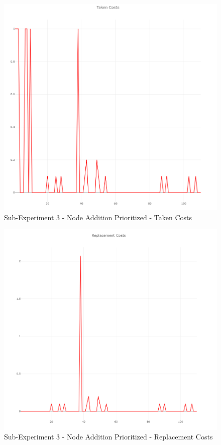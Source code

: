\begin{figure}[h]
	\centering
	\includegraphics[scale=0.5]{./pictures/addition_experiment/costs.png}
	\caption{Sub-Experiment 3 - Node Addition Prioritized - Taken Costs}
	\label{addition_experiment_costs}
\end{figure}
%
\begin{figure}[h]
	\centering
	\includegraphics[scale=0.5]{./pictures/addition_experiment/replacement.png}
	\caption{Sub-Experiment 3 - Node Addition Prioritized - Replacement Costs}
	\label{addition_experiment_rep}
\end{figure}

